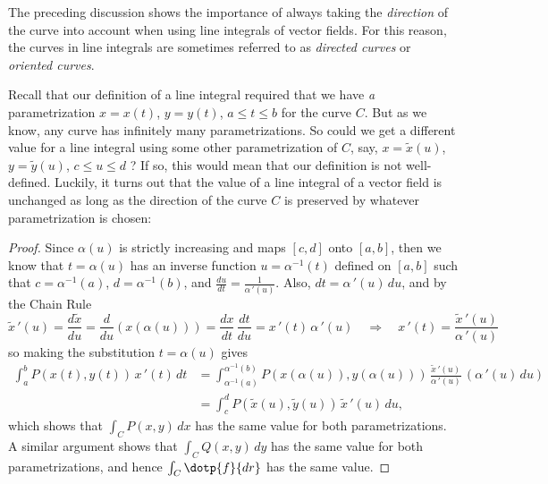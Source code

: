 The preceding discussion shows the importance of always taking the \emph{direction} of the curve into account when using line integrals of vector fields. For this reason, the curves in line integrals are sometimes referred to as \emph{directed curves} or \emph{oriented curves}.

Recall that our definition of a line integral required that we have \emph{a} parametrization $x=x(t)$, $y=y(t)$, $a \le t \le b$ for the curve $C$. But as we know, any curve has infinitely many parametrizations. So could we get a different value for a line integral using some other parametrization of $C$, say, $x=\tilde{x}(u)$, $y=\tilde{y}(u)$, $c \le u \le d$ ? If so, this would mean that our definition is not well-defined. Luckily, it turns out that the value of a line integral of a vector field is unchanged as long as the direction of the curve $C$ is preserved by whatever parametrization is chosen:


\begin{proof}
 Since $\alpha(u)$ is strictly increasing and maps $[c,d]$ onto $[a,b]$, then we know that $t=\alpha(u)$ has an inverse function $u=\alpha^{-1}(t)$ defined on $[a,b]$ such that $c=\alpha^{-1}(a)$, $d=\alpha^{-1}(b)$, and $\frac{du}{dt} = \frac{1}{\alpha\,'(u)}$. Also, $dt = \alpha\,'(u)\,du$, and by the Chain Rule
 \[
  \tilde{x}\,'(u) = \frac{d\tilde{x}}{du} = \frac{d}{du}(x(\alpha(u))) = \frac{dx}{dt}\,\frac{dt}{du} =
  x\,'(t)\,\alpha\,'(u) \quad\Rightarrow\quad x\,'(t) = \frac{\tilde{x}\,'(u)}{\alpha\,'(u)}
 \]
 so making the substitution $t=\alpha(u)$ gives
 \begin{align*}
  \int_a^b P(x(t),y(t))\,x\,'(t)\,dt &=
   \int_{\alpha^{-1}(a)}^{\alpha^{-1}(b)} P(x(\alpha(u)),y(\alpha(u)))\,\frac{\tilde{x}\,'(u)}{\alpha\,'(u)}
   \,(\alpha\,'(u)\,du)\\
   &= \int_c^d P(\tilde{x}(u),\tilde{y}(u))\,\tilde{x}\,'(u)\,du ,
 \end{align*}
 which shows that $\int_C P(x,y)\,dx$ has the same value for both parametrizations. A similar argument shows that $\int_C Q(x,y)\,dy$ has the same value for both parametrizations, and hence $\int_C \dotp{f}{dr}$
 has the same value.
\end{proof}


